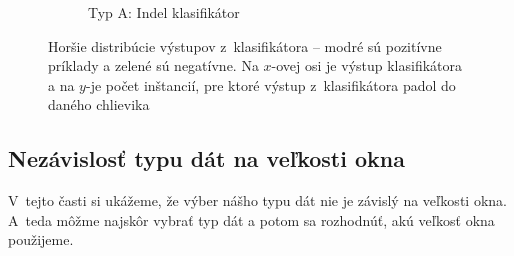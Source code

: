 \begin{figure}[htbp]
\begin{subfigure}[t]{0.4\textwidth}
                \caption{Typ A: Indel klasifikátor}
                \label{fig:datatype1-out-i}
        \end{subfigure}
        \caption[Horšie distribúcie výstupov z~klasifikátora]{Horšie distribúcie výstupov z~klasifikátora -- modré sú pozitívne príklady a zelené sú negatívne. Na $x$-ovej osi je výstup klasifikátora a na $y$-je počet inštancií, pre ktoré výstup z~klasifikátora padol do daného chlievika}
        \label{fig:datatype-bad-out}
\end{figure}

\FloatBarrier

\subsection{Nezávislosť typu dát na veľkosti okna}
\label{subsec:window-size}
V~tejto časti si ukážeme, že výber nášho typu dát nie je závislý na veľkosti okna. A~teda môžme najskôr vybrať typ dát a potom sa rozhodnúť, akú veľkosť okna použijeme.

